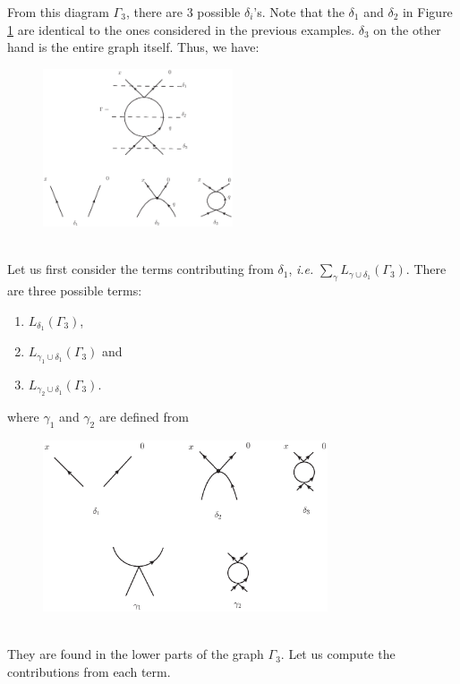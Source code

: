 \documentclass{article}
\begin{document}
From this diagram $\Gamma_3$, there are 3 possible $\delta_i$'s. Note that the $\delta_1$ and $\delta_2$ in Figure \ref{gamma3&delta} are identical to the ones considered in the previous examples. $\delta_3$ on the other hand is the entire graph itself. Thus, we have:\\
\begin{figure}[H]
\centering
\includegraphics[width=0.5\textwidth]{Graphs/Gammadelta.eps}
\label{gamma3&delta}
\end{figure}\\
Let us first consider the terms contributing from $\delta_1$, \textit{i.e.} $\sum_{\gamma}L_{\gamma \cup \delta_1}(\Gamma_3)$. There are three possible terms:
\begin{enumerate}
    \item $L_{\delta_1}(\Gamma_3)$,
    \item $L_{\gamma_1 \cup \delta_1}(\Gamma_3)$ and
    \item $L_{\gamma_2 \cup \delta_1}(\Gamma_3)$.
\end{enumerate}
where $\gamma_1$ and $\gamma_2$ are defined from 
\begin{figure}[H]
\centering
\includegraphics[width=0.75\textwidth]{Graphs/deltagamma.eps}
\end{figure}\\
They are found in the lower parts of the graph $\Gamma_3$. Let us compute the contributions from each term.
\end{document}
